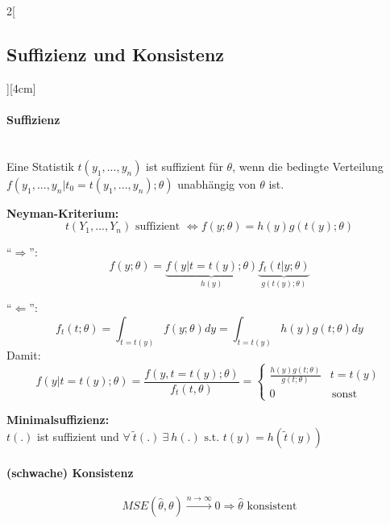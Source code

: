 \documentclass[8pt]{extarticle}
\begin{document}
\begin{multicols}{2}[\subsection{Suffizienz und Konsistenz}][4cm]

\paragraph{Suffizienz} \ \\
\noindent Eine Statistik $t(y_1,...,y_n)$ ist suffizient für $\theta$, wenn die bedingte Verteilung $f(y_1,...,y_n|t_0 = t(y_1,...,y_n);\theta)$ unabhängig von $\theta$ ist. \vspace{0.5em}

\textbf{Neyman-Kriterium:}
$$t(Y_1,...,Y_n) \text{ suffizient } \Leftrightarrow f(y;\theta) = h(y)g\left(t(y);\theta\right)$$
\begin{Beweis}
``$\Rightarrow$'':
$$f(y;\theta) = \underbrace{f(y|t = t(y);\theta)}_{h(y)} \underbrace{f_t(t|y;\theta)}_{g(t(y);\theta)}$$

\noindent ``$\Leftarrow$'':
$$f_t(t;\theta) = \int_{t=t(y)} f(y;\theta)dy = \int_{t=t(y)} h(y) g(t;\theta)dy$$
\indent Damit:
$$f\left(y|t=t(y);\theta\right) = \frac{f(y,t=t(y);\theta)}{f_t(t,\theta)}
= \begin{cases}
\frac{h(y)g(t;\theta)}{g(t;\theta)} & t=t(y) \\
0 & \, \text{sonst}
\end{cases}$$
\end{Beweis}

\textbf{Minimalsuffizienz:} \ \\
$t(.)$ ist suffizient und $\forall\: \tilde{t}(.)\: \exists\: h(.) \text{ s.t. } t(y) = h(\tilde{t}(y))$

\paragraph{(schwache) Konsistenz}
$$MSE(\hat{\theta},\theta) \overset{n\rightarrow\infty}{\longrightarrow} 0 \Rightarrow \hat{\theta} \text{ konsistent}$$

\end{multicols}
\end{document}

